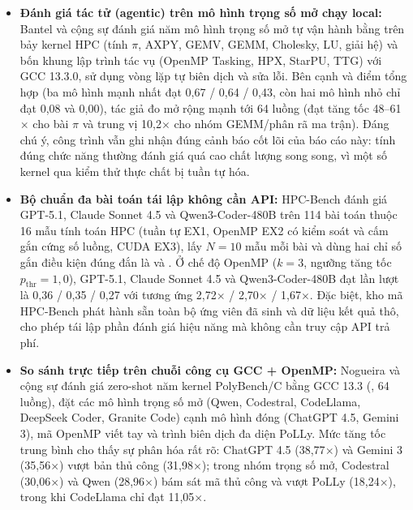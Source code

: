 \begin{itemize}
  \item \textbf{Đánh giá tác tử (agentic) trên mô hình trọng số mở chạy local:}
        Bantel và cộng sự \cite{bantel2026agentic} đánh giá năm mô hình trọng số mở
        tự vận hành bằng  trên bảy kernel HPC (tính $\pi$, AXPY,
        GEMV, GEMM, Cholesky, LU, giải hệ) và bốn khung lập trình tác vụ (OpenMP
        Tasking, HPX, StarPU, TTG) với GCC 13.3.0, sử dụng vòng lặp tự biên dịch và
        sửa lỗi. Bên cạnh  và điểm tổng hợp  (ba mô hình
        mạnh nhất đạt 0,67 / 0,64 / 0,43, còn hai mô hình nhỏ chỉ đạt 0,08 và
        0,00), tác giả đo mở rộng mạnh tới 64 luồng (đạt tăng tốc 48--61$\times$
        cho bài $\pi$ và trung vị 10,2$\times$ cho nhóm GEMM/phân rã ma trận). Đáng
        chú ý, công trình vẫn ghi nhận đúng cảnh báo cốt lõi của báo cáo này: tính
        đúng chức năng thường đánh giá quá cao chất lượng song song, vì một số
        kernel qua kiểm thử thực chất bị tuần tự hóa.
  \item \textbf{Bộ chuẩn đa bài toán tái lập không cần API:} HPC-Bench
        \cite{cui2026hpcbench} đánh giá GPT-5.1, Claude Sonnet 4.5 và
        Qwen3-Coder-480B trên 114 bài toán thuộc 16 mẫu tính toán HPC (tuần tự EX1,
        OpenMP EX2 có kiểm soát  và cấm gắn cứng số luồng,
        CUDA EX3), lấy $N=10$ mẫu mỗi bài và dùng hai chỉ số gắn điều kiện đúng đắn
        là  và . Ở chế độ OpenMP ($k=3$, ngưỡng tăng
        tốc $p_{\mathrm{thr}}=1{,}0$), GPT-5.1, Claude Sonnet 4.5 và
        Qwen3-Coder-480B đạt  lần lượt là 0,36 / 0,35 / 0,27 với
         tương ứng 2,72$\times$ / 2,70$\times$ / 1,67$\times$. Đặc
        biệt, kho mã HPC-Bench phát hành sẵn toàn bộ ứng viên đã sinh và dữ liệu
        kết quả thô, cho phép tái lập phần đánh giá hiệu năng mà không cần truy cập
        API trả phí.
  \item \textbf{So sánh trực tiếp trên chuỗi công cụ GCC + OpenMP:} Nogueira và
        cộng sự \cite{nogueira2026openmp} đánh giá zero-shot năm kernel PolyBench/C
        bằng GCC 13.3 (, 64 luồng), đặt các mô hình trọng số mở
        (Qwen, Codestral, CodeLlama, DeepSeek Coder, Granite Code) cạnh mô hình
        đóng (ChatGPT 4.5, Gemini 3), mã OpenMP viết tay và trình biên dịch đa diện
        PoLLy. Mức tăng tốc trung bình cho thấy sự phân hóa rất rõ: ChatGPT 4.5
        (38,77$\times$) và Gemini 3 (35,56$\times$) vượt bản thủ công
        (31,98$\times$); trong nhóm trọng số mở, Codestral (30,06$\times$) và Qwen
        (28,96$\times$) bám sát mã thủ công và vượt PoLLy (18,24$\times$), trong
        khi CodeLlama chỉ đạt 11,05$\times$.
\end{itemize}

